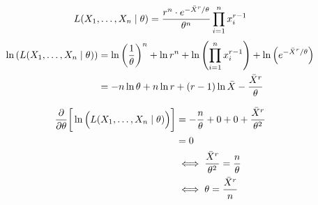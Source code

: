 $$L({X}_1, \dots, {X}_n \mid \theta) = \frac{r^n \cdot e^{-\bar{X}^r/\theta}}{\theta^n} \prod_{i=1}^n x^{r-1}_i $$ 
\begin{align*}\ln \left( {L({X}_1, \dots, {X}_n \mid \theta)} \right) &= \ln\left( \frac{1}{{\theta}} \right)^n + \ln r^n + \ln \left( { \prod_{i=1}^n x^{r-1}_i } \right) + \ln \left( { e^{-\bar{X}^r/\theta}} \right)\\
    &= -n \ln \theta + n \ln r + (r-1)\ln \bar{X} - \frac{\bar{X}^r}{\theta} 
\end{align*}

\begin{align*}
    \pdv{}{\theta}\bigg[\ln \Big(L({X}_1, \dots, {X}_n \mid \theta)\Big)\bigg] &= -\frac{n}{\theta} + 0 + 0 + \frac{\bar{X}^r}{\theta^2}
    \\ &= 0
    \\ & \iff  \frac{\bar{X}^r}{\theta^2} = \frac{n}{\theta}\\
    & \iff \theta = \frac{\bar{X}^r}{n}
\end{align*}